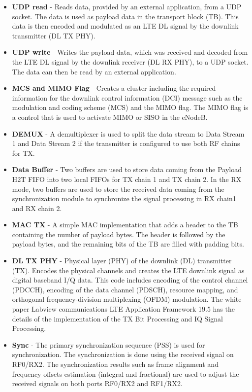 \begin{itemize}
    \item \textbf{UDP read} -
        Reads data, provided by an external application, from a UDP socket. The data is used as payload data in the transport block (TB). This data is then encoded and modulated as an LTE DL signal by the downlink transmitter (DL TX PHY).
    \item \textbf{UDP write} -
        Writes the payload data, which was received and decoded from the LTE DL signal by the downlink receiver (DL RX PHY), to a UDP socket. The data can then be read by an external application.
    \item \textbf{MCS and MIMO Flag} -
        Creates a cluster including the required information for the downlink control information (DCI) message such as the modulation and coding scheme (MCS) and the MIMO flag. The MIMO flag is a control that is used to activate MIMO or SISO in the eNodeB.
    \item \textbf{DEMUX} -
        A demultiplexer is used to split the data stream to Data Stream 1 and Data Stream 2 if the transmitter is configured to use both RF chains for TX. 
    \item \textbf{Data Buffer} -
        Two buffers are used to store data coming from the Payload H2T FIFO into two local FIFOs for TX chain 1 and TX chain 2. In the RX mode, two buffers are used to store the received data coming from the synchronization module to synchronize the signal processing in RX chain1 and RX chain 2.
    \item \textbf{MAC TX} -
        A simple MAC implementation that adds a header to the TB containing the number of payload bytes. The header is followed by the payload bytes, and the remaining bits of the TB are filled with padding bits.
    \item \textbf{DL TX PHY} -
        Physical layer (PHY) of the downlink (DL) transmitter (TX). Encodes the physical channels and creates the LTE downlink signal as digital baseband I/Q data. This code includes encoding of the control channel (PDCCH), encoding of the data channel (PDSCH), resource mapping, and orthogonal frequency-division multiplexing (OFDM) modulation. The white paper Labview communications LTE Application Framework 19.5\cite{LTEAFWManual} has the details of the implementation of the TX Bit Processing and IQ Signal Processing.
    \item \textbf{Sync} -
        The primary synchronization sequence (PSS) is used for synchronization. The synchronization is done using the received signal on RF0/RX2. The synchronization results such as frame alignment and frequency offsets estimation (integral and fractional) are used to adjust the received signals on both ports RF0/RX2 and RF1/RX2.

\end{itemize}
